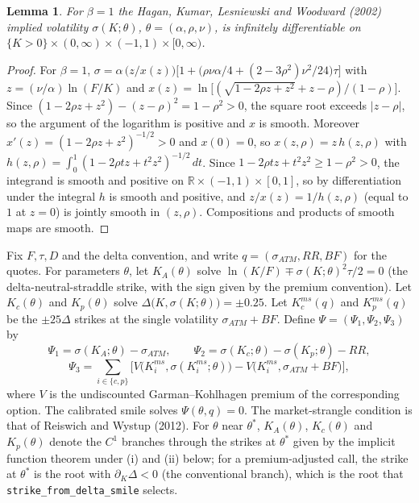 \documentclass[11pt]{article}
\newtheorem{lemma}[proposition]{Lemma}
\theoremstyle{remark}
\begin{document}
\begin{lemma}
For $\beta=1$ the Hagan, Kumar, Lesniewski and Woodward (2002) implied volatility $\sigma(K;\theta)$, $\theta=(\alpha,\rho,\nu)$, is infinitely differentiable on $\{K>0\}\times(0,\infty)\times(-1,1)\times[0,\infty)$.
\end{lemma}

\begin{proof}
For $\beta=1$, $\sigma=\alpha\,\bigl(z/x(z)\bigr)\bigl[1+\bigl(\rho\nu\alpha/4+(2-3\rho^2)\nu^2/24\bigr)\tau\bigr]$ with $z=(\nu/\alpha)\ln(F/K)$ and $x(z)=\ln\bigl[(\sqrt{1-2\rho z+z^2}+z-\rho)/(1-\rho)\bigr]$. Since $(1-2\rho z+z^2)-(z-\rho)^2=1-\rho^2>0$, the square root exceeds $|z-\rho|$, so the argument of the logarithm is positive and $x$ is smooth. Moreover $x'(z)=(1-2\rho z+z^2)^{-1/2}>0$ and $x(0)=0$, so $x(z,\rho)=z\,h(z,\rho)$ with $h(z,\rho)=\int_0^1(1-2\rho tz+t^2z^2)^{-1/2}\,dt$. Since $1-2\rho tz+t^2z^2\ge1-\rho^2>0$, the integrand is smooth and positive on $\mathbb R\times(-1,1)\times[0,1]$, so by differentiation under the integral $h$ is smooth and positive, and $z/x(z)=1/h(z,\rho)$ (equal to $1$ at $z=0$) is jointly smooth in $(z,\rho)$. Compositions and products of smooth maps are smooth.
\end{proof}

Fix $F,\tau,D$ and the delta convention, and write $q=(\sigma_{ATM},RR,BF)$ for the quotes. For parameters $\theta$, let $K_A(\theta)$ solve $\ln(K/F)\mp\sigma(K;\theta)^2\tau/2=0$ (the delta-neutral-straddle strike, with the sign given by the premium convention). Let $K_c(\theta)$ and $K_p(\theta)$ solve $\Delta\bigl(K,\sigma(K;\theta)\bigr)=\pm0.25$. Let $K^{ms}_{c}(q)$ and $K^{ms}_{p}(q)$ be the $\pm25\Delta$ strikes at the single volatility $\sigma_{ATM}+BF$. Define $\Psi=(\Psi_1,\Psi_2,\Psi_3)$ by
\[
\Psi_1=\sigma(K_A;\theta)-\sigma_{ATM},\qquad \Psi_2=\sigma(K_c;\theta)-\sigma(K_p;\theta)-RR,
\]
\[
\Psi_3=\sum_{i\in\{c,p\}}\bigl[V\bigl(K^{ms}_i,\sigma(K^{ms}_i;\theta)\bigr)-V\bigl(K^{ms}_i,\sigma_{ATM}+BF\bigr)\bigr],
\]
where $V$ is the undiscounted Garman--Kohlhagen premium of the corresponding option. The calibrated smile solves $\Psi(\theta,q)=0$. The market-strangle condition is that of Reiswich and Wystup (2012). For $\theta$ near $\theta^*$, $K_A(\theta)$, $K_c(\theta)$ and $K_p(\theta)$ denote the $C^1$ branches through the strikes at $\theta^*$ given by the implicit function theorem under (i) and (ii) below; for a premium-adjusted call, the strike at $\theta^*$ is the root with $\partial_K\Delta<0$ (the conventional branch), which is the root that \texttt{strike\_from\_delta\_smile} selects.
\end{document}
